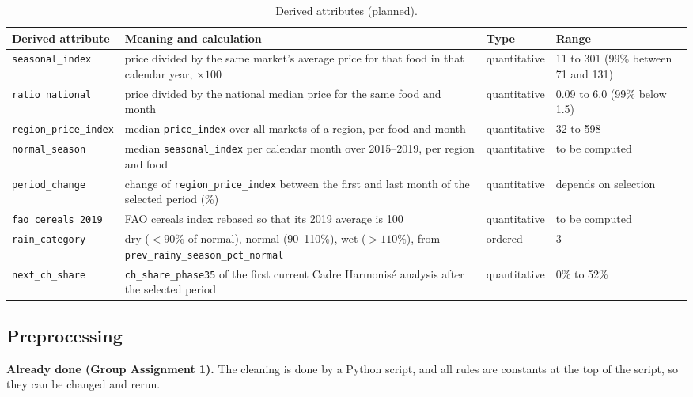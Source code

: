 \documentclass{article}
\begin{document}
\begin{table}[H]
  \centering
  \small
  \begin{tabularx}{\linewidth}{l X l X}
    \hline
    \textbf{Derived attribute} & \textbf{Meaning and calculation} & \textbf{Type} & \textbf{Range} \\
    \hline
    \texttt{seasonal\_index} & price divided by the same market's average price for that food in that calendar year, $\times 100$ & quantitative & 11 to 301 (99\% between 71 and 131) \\
    \texttt{ratio\_national} & price divided by the national median price for the same food and month & quantitative & 0.09 to 6.0 (99\% below 1.5) \\
    \texttt{region\_price\_index} & median \texttt{price\_index} over all markets of a region, per food and month & quantitative & 32 to 598 \\
    \texttt{normal\_season} & median \texttt{seasonal\_index} per calendar month over 2015--2019, per region and food & quantitative & to be computed \\
    \texttt{period\_change} & change of \texttt{region\_price\_index} between the first and last month of the selected period (\%) & quantitative & depends on selection \\
    \texttt{fao\_cereals\_2019} & FAO cereals index rebased so that its 2019 average is 100 & quantitative & to be computed \\
    \texttt{rain\_category} & dry ($<90\%$ of normal), normal (90--110\%), wet ($>110\%$), from \texttt{prev\_rainy\_season\_pct\_normal} & ordered & 3 \\
    \texttt{next\_ch\_share} & \texttt{ch\_share\_phase35} of the first current Cadre Harmonis\'e analysis after the selected period & quantitative & 0\% to 52\% \\
    \hline
  \end{tabularx}
  \caption{Derived attributes (planned).}
  \label{tab:derived}
\end{table}

\subsection{Preprocessing}

\textbf{Already done (Group Assignment 1).} The cleaning is done by a Python script, and all rules are constants at the top of the script, so they can be changed and rerun.
\end{document}
